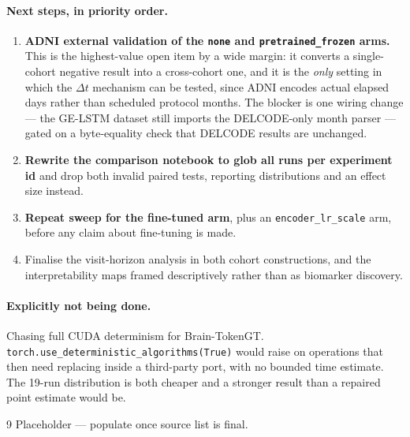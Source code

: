 \documentclass[11pt,a4paper]{article}
\begin{document}
\paragraph{Next steps, in priority order.}
\begin{enumerate}
  \item \textbf{ADNI external validation of the \texttt{none} and
    \texttt{pretrained\_frozen} arms.} This is the highest-value open item by a wide
    margin: it converts a single-cohort negative result into a cross-cohort one, and it is
    the \emph{only} setting in which the $\Delta t$ mechanism can be tested, since ADNI
    encodes actual elapsed days rather than scheduled protocol months. The blocker is one
    wiring change --- the GE-LSTM dataset still imports the DELCODE-only month parser ---
    gated on a byte-equality check that DELCODE results are unchanged.
  \item \textbf{Rewrite the comparison notebook to glob all runs per experiment id} and
    drop both invalid paired tests, reporting distributions and an effect size instead.
  \item \textbf{Repeat sweep for the fine-tuned arm}, plus an \texttt{encoder\_lr\_scale}
    arm, before any claim about fine-tuning is made.
  \item Finalise the visit-horizon analysis in both cohort constructions, and the
    interpretability maps framed descriptively rather than as biomarker discovery.
\end{enumerate}

\paragraph{Explicitly not being done.} Chasing full CUDA determinism for Brain-TokenGT.
\texttt{torch.use\_deterministic\_algorithms(True)} would raise on operations that then
need replacing inside a third-party port, with no bounded time estimate. The 19-run
distribution is both cheaper and a stronger result than a repaired point estimate would be.


\begin{thebibliography}{9}
 Placeholder --- populate once source list is final.
\end{thebibliography}
\end{document}
